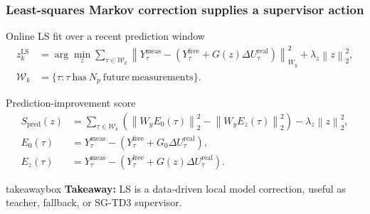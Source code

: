 \documentclass[aspectratio=169]{beamer}
\newcommand{\norm}[1]{\left\lVert #1 \right\rVert}
\newcommand{\takeawaybox}[1]{%
\vspace{0.02cm}
\begin{center}
\begin{beamercolorbox}[wd=0.94\textwidth,sep=3pt,center,rounded=true,shadow=false]{takeawaybox}
\scriptsize
\textbf{\textcolor{maroon1}{Takeaway:}} #1
\end{beamercolorbox}
\end{center}
}
\begin{document}
\begin{frame}
\frametitle{\large \textbf{Least-squares Markov correction supplies a supervisor action}}
\scriptsize

\begin{block}{Online LS fit over a recent prediction window}
\begin{align*}
z_k^{\mathrm{LS}}
&=\arg\min_z
\sum_{\tau\in\mathcal{W}_k}
\norm{Y_\tau^{\mathrm{meas}}
-\left(Y_\tau^{\mathrm{free}}+G(z)\Delta U_\tau^{\mathrm{real}}\right)}_{W_y}^2
+\lambda_z\norm{z}_2^2,\\
\mathcal{W}_k&=\{\tau: \tau \ \mathrm{has}\ N_p\ \mathrm{future\ measurements}\}.
\end{align*}
\end{block}

\begin{block}{Prediction-improvement score}
\begin{align*}
S_{\mathrm{pred}}(z)
&=\sum_{\tau\in\mathcal{W}_k}
\left(
\norm{W_yE_0(\tau)}_2^2-\norm{W_yE_z(\tau)}_2^2
\right)
-\lambda_z\norm{z}_2^2,\\
E_0(\tau)&=Y_\tau^{\mathrm{meas}}-\left(Y_\tau^{\mathrm{free}}+G_0\Delta U_\tau^{\mathrm{real}}\right),\\
E_z(\tau)&=Y_\tau^{\mathrm{meas}}-\left(Y_\tau^{\mathrm{free}}+G(z)\Delta U_\tau^{\mathrm{real}}\right).
\end{align*}
\end{block}

\takeawaybox{LS is a data-driven local model correction, useful as teacher, fallback, or SG-TD3 supervisor.}
\end{frame}
\end{document}
